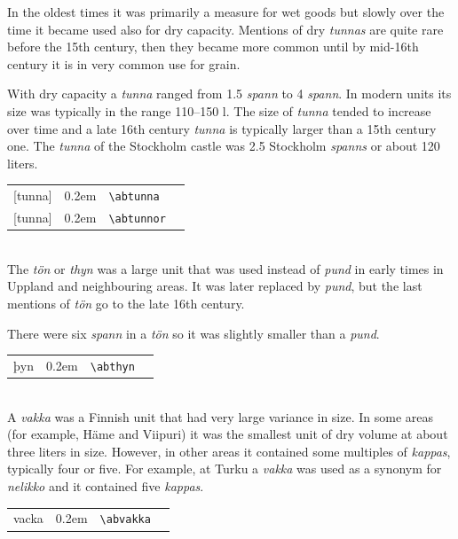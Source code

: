 \documentclass[a4paper]{article}
\newcommand{\samplefont}{\fontsize{16}{16}\abcursivefamily\spaceskip0.2em}
\newcommand{\sample}[1]{{\samplefont #1 \strut}}
\newcommand{\ltxncmd}[1]{\texttt{\textbackslash{}#1}}
\begin{document}
\begin{description}
  In the oldest times it was primarily a measure for wet goods but
  slowly over the time it became used also for dry capacity. Mentions
  of dry \emph{tunnas} are quite rare before the 15th century, then
  they became more common until by mid-16th century it is in very
  common use for grain.

  With dry capacity a \emph{tunna} ranged from 1.5 \emph{spann} to 4
  \emph{spann}. In modern units its size was typically in the range
  110–150 l. The size of \emph{tunna} tended to increase over time and
  a late 16th century \emph{tunna} is typically larger than a 15th
  century one. The \emph{tunna} of the Stockholm castle was 2.5
  Stockholm \emph{spanns} or about 120 liters.

  \begin{center}
    \begin{tabular}{llll}
      {}[tunna] & \sample{\abtunna} & \ltxncmd{abtunna} \\
      {}[tunna] & \sample{\abtunnor} & \ltxncmd{abtunnor} \\
    \end{tabular}
  \end{center}


\item [\sample{\abthyn} \emph{tön} ] \mbox{} \\
  The \emph{tön} or \emph{thyn} was a large unit that was used instead
  of \emph{pund} in early times in Uppland and neighbouring areas. It
  was later replaced by \emph{pund}, but the last mentions of
  \emph{tön} go to the late 16th century.

  There were six \emph{spann} in a \emph{tön} so it was slightly
  smaller than a \emph{pund}. 
  \begin{center}
    \begin{tabular}{llll}
      {}þyn & \sample{\abthyn} & \ltxncmd{abthyn} \\
    \end{tabular}
  \end{center}


\item [\sample{\abvakka} \emph{vakka}] \mbox{} \\
  A \emph{vakka} was a Finnish unit that had very large variance in
  size. In some areas (for example, Häme and Viipuri) it was the
  smallest unit of dry volume at about three liters in size. However,
  in other areas it contained some multiples of \emph{kappas},
  typically four or five. For example, at Turku a \emph{vakka} was
  used as a synonym for \emph{nelikko} and it contained five
  \emph{kappas}.
  \begin{center}
    \begin{tabular}{llll}
      {}vacka & \sample{\abvakka} & \ltxncmd{abvakka} \\
    \end{tabular}
  \end{center}
\end{description}
\end{document}
